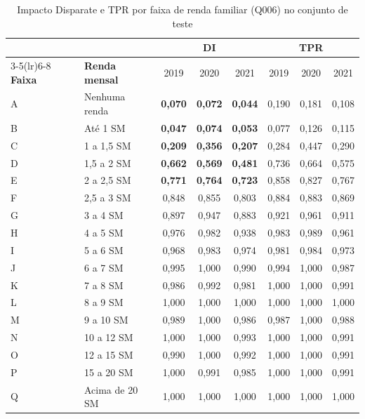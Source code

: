 \begin{table}[htbp]
\centering
\caption{Impacto Disparate e TPR por faixa de renda familiar (Q006) no conjunto de teste}
\label{tab:di_renda}
\begin{tabular}{llcccccc}
\toprule
 & & \multicolumn{3}{c}{\textbf{DI}} & \multicolumn{3}{c}{\textbf{TPR}} \\
\cmidrule(lr){3-5}\cmidrule(lr){6-8}
\textbf{Faixa} & \textbf{Renda mensal} & 2019 & 2020 & 2021 & 2019 & 2020 & 2021 \\
\midrule
A & Nenhuma renda & \textbf{0,070} & \textbf{0,072} & \textbf{0,044} & 0,190 & 0,181 & 0,108 \\
B & Até 1 SM & \textbf{0,047} & \textbf{0,074} & \textbf{0,053} & 0,077 & 0,126 & 0,115 \\
C & 1 a 1,5 SM & \textbf{0,209} & \textbf{0,356} & \textbf{0,207} & 0,284 & 0,447 & 0,290 \\
D & 1,5 a 2 SM & \textbf{0,662} & \textbf{0,569} & \textbf{0,481} & 0,736 & 0,664 & 0,575 \\
E & 2 a 2,5 SM & \textbf{0,771} & \textbf{0,764} & \textbf{0,723} & 0,858 & 0,827 & 0,767 \\
F & 2,5 a 3 SM & 0,848 & 0,855 & 0,803 & 0,884 & 0,883 & 0,869 \\
G & 3 a 4 SM & 0,897 & 0,947 & 0,883 & 0,921 & 0,961 & 0,911 \\
H & 4 a 5 SM & 0,976 & 0,982 & 0,938 & 0,983 & 0,989 & 0,961 \\
I & 5 a 6 SM & 0,968 & 0,983 & 0,974 & 0,981 & 0,984 & 0,973 \\
J & 6 a 7 SM & 0,995 & 1,000 & 0,990 & 0,994 & 1,000 & 0,987 \\
K & 7 a 8 SM & 0,986 & 0,992 & 0,981 & 1,000 & 1,000 & 0,991 \\
L & 8 a 9 SM & 1,000 & 1,000 & 1,000 & 1,000 & 1,000 & 1,000 \\
M & 9 a 10 SM & 0,989 & 1,000 & 0,986 & 0,987 & 1,000 & 0,988 \\
N & 10 a 12 SM & 1,000 & 1,000 & 0,993 & 1,000 & 1,000 & 0,991 \\
O & 12 a 15 SM & 0,990 & 1,000 & 0,992 & 1,000 & 1,000 & 0,991 \\
P & 15 a 20 SM & 1,000 & 0,991 & 0,985 & 1,000 & 1,000 & 0,991 \\
Q & Acima de 20 SM & 1,000 & 1,000 & 1,000 & 1,000 & 1,000 & 1,000 \\
\bottomrule
\end{tabular}
\end{table}
